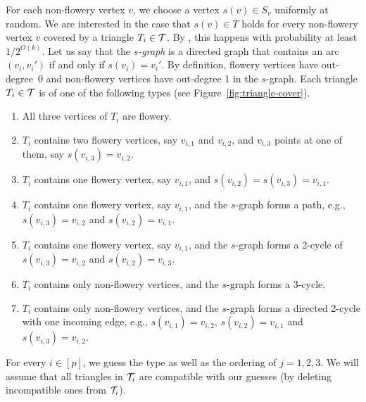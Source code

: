 For each non-flowery vertex $v$, we choose a vertex $s(v) \in S_v$ uniformly at random.
We are interested in the case that  $s(v) \in T$  holds for every non-flowery vertex $v$ covered by a triangle $T_i \in \mathcal T$.
By , this happens with probability at least $1/2^{O(k)}$.
Let us say that the \emph{$s$-graph} is a directed graph that contains an arc $(v_i, v_i')$ if and only if $s(v_i) = v_i'$.
By definition, flowery vertices have out-degree~0 and non-flowery vertices have out-degree 1 in the  $s$-graph.
Each triangle $T_i \in \mathcal T$  
is of one of the following types (see Figure~\ref{fig:triangle-cover}).
\begin{enumerate}
\item \label{type:hhh} All three vertices of $T_i$ are flowery.
\item \label{type:hhl} $T_i$ contains two flowery vertices, say $v_{i,1}$
  and $v_{i,2}$, and $v_{i,3}$ points at one of them,
  say $s(v_{i,3})=v_{i,2}$.
\item \label{type:hla} $T_i$ contains one flowery vertex, say $v_{i,1}$,
  and $s(v_{i,2})=s(v_{i,3})=v_{i,1}$.
\item \label{type:hlp} $T_i$ contains one flowery vertex, say $v_{i,1}$,
  and the $s$-graph forms a path, e.g.,
  $s(v_{i,3})=v_{i,2}$ and $s(v_{i,2})=v_{i,1}$.
\item \label{type:hlc} $T_i$ contains one flowery vertex, say $v_{i,1}$,
  and the $s$-graph forms a 2-cycle of
  $s(v_{i,3})=v_{i,2}$ and $s(v_{i,2})=v_{i,3}$.
\item \label{type:l3c} $T_i$ contains only non-flowery vertices,
  and the $s$-graph forms a 3-cycle.
\item \label{type:l2c} $T_i$ contains only non-flowery vertices,
  and the $s$-graph forms a directed 2-cycle
  with one incoming edge,
  e.g., $s(v_{i,1})=v_{i,2}$, $s(v_{i,2})=v_{i,1}$
  and $s(v_{i,3})=v_{i,2}$.
\end{enumerate}
For every $i \in [p]$, we guess the type as well as the
ordering of $j=1,2,3$.
We will assume that all triangles in $\mathcal T_i$ are compatible with our guesses (by deleting incompatible ones from $\mathcal T_i$). 


